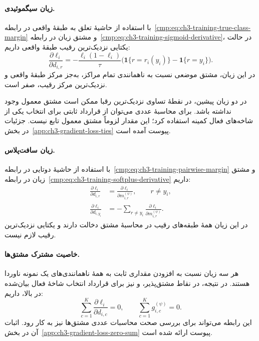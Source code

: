 \paragraph{زیان سیگموئیدی.}
با استفاده از حاشیهٔ تعلق به طبقهٔ واقعی در
رابطه~\eqref{cmp:eq:ch3-training-true-class-margin}
و مشتق زیان در
رابطه~\eqref{cmp:eq:ch3-training-sigmoid-derivative}،
در حالت یکتایی نزدیک‌ترین رقیب طبقهٔ واقعی داریم:
\begin{equation}\label{cmp:eq:ch3-gradient-sigmoid-distance}
\boxed{
\frac{\partial\ell_i}{\partial d_{i,r}}
=-\frac{\ell_i(1-\ell_i)}{\tau}
\bigl(\mathbf1\{r=r_i(y_i)\}-\mathbf1\{r=y_i\}\bigr).
}
\end{equation}
در این زیان، مشتق موضعی نسبت به ناهمانندی
تمام مراکز، به‌جز مرکز طبقهٔ واقعی و نزدیک‌ترین
مرکز رقیب، صفر است.

در دو زیان پیشین، در نقطهٔ تساوی نزدیک‌ترین
رقبا ممکن است مشتق معمول وجود نداشته باشد.
برای محاسبهٔ عددی می‌توان از قرارداد ثابتی برای
انتخاب یکی از شاخه‌های فعال کمینه استفاده کرد؛
این مقدار لزوماً مشتق معمول تابع نیست.
جزئیات در بخش~\ref{app:ch3-gradient-loss-ties}
پیوست آمده است.

\paragraph{زیان سافت‌پلاس.}
با استفاده از حاشیهٔ دوتایی در
رابطه~\eqref{cmp:eq:ch3-training-pairwise-margin}
و مشتق زیان در
رابطه~\eqref{cmp:eq:ch3-training-softplus-derivative}
داریم:
\begin{equation}\label{cmp:eq:ch3-gradient-softplus-distance}
\boxed{
\begin{aligned}
\frac{\partial\ell_i}{\partial d_{i,r}}
&=\frac{\partial\ell_i}{\partial m_{i,r}^{(\psi)}},
\qquad r\ne y_i,\\
\frac{\partial\ell_i}{\partial d_{i,y_i}}
&=-\sum_{r\ne y_i}
\frac{\partial\ell_i}{\partial m_{i,r}^{(\psi)}}.
\end{aligned}}
\end{equation}
در این زیان همهٔ طبقه‌های رقیب در محاسبهٔ
مشتق دخالت دارند و یکتایی نزدیک‌ترین رقیب
لازم نیست.

\paragraph{خاصیت مشترک مشتق‌ها.}
هر سه زیان نسبت به افزودن مقداری ثابت به همهٔ
ناهمانندی‌های یک نمونه ناوردا هستند. در نتیجه،
در نقاط مشتق‌پذیر، و نیز برای قرارداد انتخاب
شاخهٔ فعال بیان‌شده در بالا، داریم:
\begin{equation}\label{cmp:eq:ch3-gradient-loss-zero-sum}
\boxed{
\sum_{c=1}^{K}\frac{\partial\ell_i}{\partial d_{i,c}}=0,
\qquad
\sum_{c=1}^{K}g_{i,c}^{(\psi)}=0.
}
\end{equation}
این رابطه می‌تواند برای بررسی صحت محاسبات
عددی مشتق‌ها نیز به کار رود. اثبات آن در
بخش~\ref{app:ch3-gradient-loss-zero-sum} پیوست
ارائه شده است.

